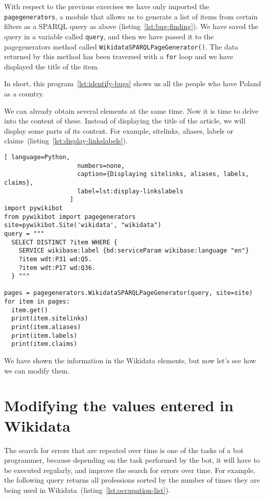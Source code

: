 With respect to the previous exercises we have only imported the \lstinline|pagegenerators|, a module that allows us to generate a list of items from certain filters as a SPARQL query as above (listing~\ref{lst:bug-finding}). 
We have saved the query in a variable called \lstinline|query|, 
and then we have passed it to the pagegenerators method called \lstinline|WikidataSPARQLPageGenerator()|. 
The data returned by this method has been traversed with a \lstinline|for| loop and we have displayed the title of the item.

In short, this program~\ref{lst:identify-bugs} shows us all the people who have Poland as a country.

We can already obtain several elements at the same time. Now it is time to delve into the content of these. Instead of displaying the title of the article, we will display some parts of its content. For example, sitelinks, aliases, labels or claims~(listing~\ref{lst:display-linkslabels}).

\begin{lstlisting}[ language=Python,
                    numbers=none,
                    caption={Displaying sitelinks, aliases, labels, claims},
                    label=lst:display-linkslabels
                  ]
import pywikibot
from pywikibot import pagegenerators
site=pywikibot.Site('wikidata', "wikidata")
query = """
  SELECT DISTINCT ?item WHERE {
    SERVICE wikibase:label {bd:serviceParam wikibase:language "en"}
    ?item wdt:P31 wd:Q5.
    ?item wdt:P17 wd:Q36.
  } """

pages = pagegenerators.WikidataSPARQLPageGenerator(query, site=site)
for item in pages:
  item.get()
  print(item.sitelinks)
  print(item.aliases)
  print(item.labels)
  print(item.claims)
\end{lstlisting} 


We have shown the information in the Wikidata elements, but now let's see how we can modify them. 

\section{Modifying the values entered in Wikidata}
\label{sec:modifying the values entered in Wikidata eng}

The search for errors that are repeated over time is one of the tasks of a bot programmer, because depending on the task performed by the bot, it will have to be executed regularly, and improve the search for errors over time. For example, the following query returns all professions sorted by the number of times they are being used in Wikidata~(listing~\ref{lst:occupation-list}).

